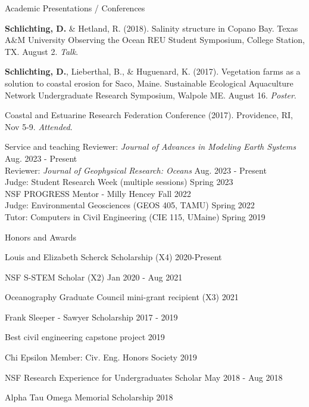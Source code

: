 \documentclass{resume} %
\begin{document}
\begin{rSection}{Academic Presentations / Conferences}
\begin{etaremune}
    \item \textbf{Schlichting, D.} \& Hetland, R. (2018). Salinity structure in Copano Bay. Texas A$\&$M University Observing the Ocean REU Student Symposium, College Station, TX. August 2. \textit{Talk}.
    \item \textbf{Schlichting, D.}, Lieberthal, B., \& Huguenard, K. (2017). Vegetation farms as a solution to coastal erosion for Saco, Maine. Sustainable Ecological Aquaculture Network Undergraduate Research Symposium, Walpole ME. August 16. \textit{Poster}.
    \item Coastal and Estuarine Research Federation Conference (2017). Providence, RI, Nov 5-9. \textit{Attended}.
\end{etaremune}
\end{rSection}

\begin{rSection}{Service and teaching}
Reviewer: \textit{Journal of Advances in Modeling Earth Systems} \hfill Aug. 2023 - Present \\
Reviewer: \textit{Journal of Geophysical Research: Oceans} \hfill Aug. 2023 - Present \\
Judge: Student Research Week (multiple sessions) \hfill Spring 2023 \\
NSF PROGRESS Mentor - Milly Hencey \hfill Fall 2022 \\
Judge: Environmental Geosciences (GEOS 405, TAMU) \hfill Spring 2022 \\
Tutor: Computers in Civil Engineering (CIE 115, UMaine) \hfill Spring 2019 \\
\end{rSection}
\vspace{-10pt}
\begin{rSection}{Honors and Awards} \itemsep -3pt {}
\vspace{-7pt}
\item Louis and Elizabeth Scherck Scholarship (X4) \hfill 2020-Present
\item NSF S-STEM Scholar (X2) \hfill Jan 2020 - Aug 2021 
\item Oceanography Graduate Council mini-grant recipient (X3) \hfill 2021
\item Frank Sleeper - Sawyer Scholarship \hfill 2017 - 2019
\item Best civil engineering capstone project \hfill 2019
\item Chi Epsilon Member: Civ. Eng. Honors Society \hfill 2019 
\item NSF Research Experience for Undergraduates Scholar \hfill May 2018 - Aug 2018
\item Alpha Tau Omega Memorial Scholarship \hfill 2018
\end{rSection}
\end{document}
